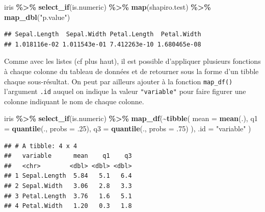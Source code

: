 \documentclass[
  11pt,
]{book}
\newenvironment{Shaded}{\begin{snugshade}}{\end{snugshade}}
\newcommand{\DataTypeTok}[1]{\textcolor[rgb]{0.13,0.29,0.53}{#1}}
\newcommand{\FloatTok}[1]{\textcolor[rgb]{0.00,0.00,0.81}{#1}}
\newcommand{\KeywordTok}[1]{\textcolor[rgb]{0.13,0.29,0.53}{\textbf{#1}}}
\newcommand{\NormalTok}[1]{#1}
\newcommand{\OperatorTok}[1]{\textcolor[rgb]{0.81,0.36,0.00}{\textbf{#1}}}
\newcommand{\StringTok}[1]{\textcolor[rgb]{0.31,0.60,0.02}{#1}}
\numberwithin{equation}{section}
\numberwithin{countremarque}{section}
\begin{document}
\begin{Shaded}
\begin{Highlighting}[]
\NormalTok{iris }\OperatorTok{\%\textgreater{}\%}\StringTok{ }
\StringTok{  }\KeywordTok{select\_if}\NormalTok{(is.numeric) }\OperatorTok{\%\textgreater{}\%}\StringTok{ }
\StringTok{  }\KeywordTok{map}\NormalTok{(shapiro.test) }\OperatorTok{\%\textgreater{}\%}\StringTok{ }
\StringTok{  }\KeywordTok{map\_dbl}\NormalTok{(}\StringTok{"p.value"}\NormalTok{)}
\end{Highlighting}
\end{Shaded}

\begin{lstlisting}
## Sepal.Length  Sepal.Width Petal.Length  Petal.Width 
## 1.018116e-02 1.011543e-01 7.412263e-10 1.680465e-08
\end{lstlisting}

Comme avec les listes (cf plus haut), il est possible d'appliquer plusieurs fonctions à chaque colonne du tableau de données et de retourner sous la forme d'un tibble chaque sous-résultat. On peut par ailleurs ajouter à la fonction \texttt{map\_df()} l'argument \texttt{.id} auquel on indique la valeur \texttt{"variable"} pour faire figurer une colonne indiquant le nom de chaque colonne.

\begin{Shaded}
\begin{Highlighting}[]
\NormalTok{iris }\OperatorTok{\%\textgreater{}\%}\StringTok{ }
\StringTok{  }\KeywordTok{select\_if}\NormalTok{(is.numeric) }\OperatorTok{\%\textgreater{}\%}\StringTok{ }
\StringTok{  }\KeywordTok{map\_df}\NormalTok{(}\OperatorTok{\textasciitilde{}}\KeywordTok{tibble}\NormalTok{(}
    \DataTypeTok{mean =} \KeywordTok{mean}\NormalTok{(.),}
    \DataTypeTok{q1 =} \KeywordTok{quantile}\NormalTok{(., }\DataTypeTok{probs =} \FloatTok{.25}\NormalTok{),}
    \DataTypeTok{q3 =} \KeywordTok{quantile}\NormalTok{(., }\DataTypeTok{probs =} \FloatTok{.75}\NormalTok{)}
\NormalTok{    ),}
    \DataTypeTok{.id =} \StringTok{"variable"}
\NormalTok{  )}
\end{Highlighting}
\end{Shaded}

\begin{lstlisting}
## # A tibble: 4 x 4
##   variable      mean    q1    q3
##   <chr>        <dbl> <dbl> <dbl>
## 1 Sepal.Length  5.84   5.1   6.4
## 2 Sepal.Width   3.06   2.8   3.3
## 3 Petal.Length  3.76   1.6   5.1
## 4 Petal.Width   1.20   0.3   1.8
\end{lstlisting}
\end{document}

